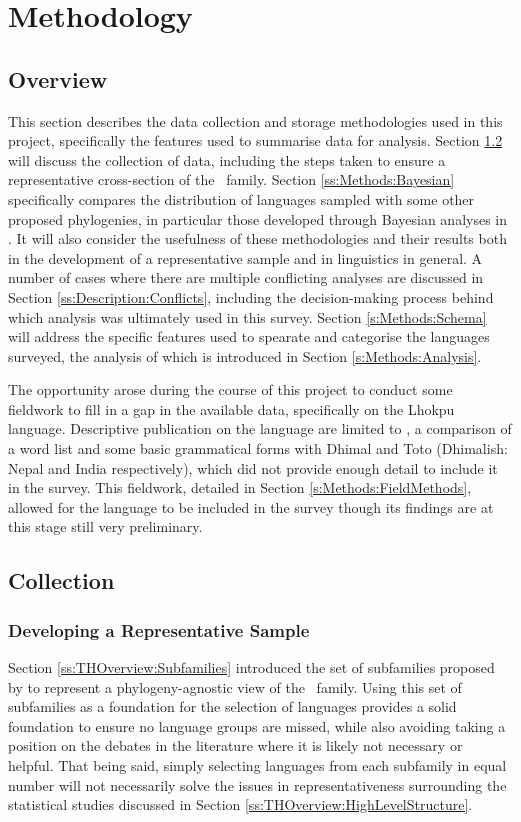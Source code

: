 \chapter{Methodology}\label{c:Methods}
\section{Overview}
This section describes the data collection and storage methodologies used in this project, specifically the features used to summarise data for analysis. Section \ref{s:Methods:Collection} will discuss the collection of data, including the steps taken to ensure a representative cross-section of the \lfam\ family. Section \ref{ss:Methods:Bayesian} specifically compares the distribution of languages sampled with some other proposed phylogenies, in particular those developed through Bayesian analyses in . It will also consider the usefulness of these methodologies and their results both in the development of a representative sample and in linguistics in general. A number of cases where there are multiple conflicting analyses are discussed in Section \ref{ss:Description:Conflicts}, including the decision-making process behind which analysis was ultimately used in this survey. Section \ref{s:Methods:Schema} will address the specific features used to spearate and categorise the languages surveyed, the analysis of which is introduced in Section \ref{s:Methods:Analysis}.

The opportunity arose during the course of this project to conduct some fieldwork to fill in a gap in the available data, specifically on the Lhokpu language. Descriptive publication on the language are limited to , a comparison of a word list and some basic grammatical forms with Dhimal and Toto (Dhimalish: Nepal and India respectively), which did not provide enough detail to include it in the survey. This fieldwork, detailed in Section \ref{s:Methods:FieldMethods}, allowed for the language to be included in the survey though its findings are at this stage still very preliminary.  

\section{Collection}\label{s:Methods:Collection}
\subsection{Developing a Representative Sample}\label{ss:Methods:RepSample}
Section \ref{ss:THOverview:Subfamilies} introduced the set of subfamilies proposed by  to represent a phylogeny-agnostic view of the \lfam\ family. Using this set of subfamilies as a foundation for the selection of languages provides a solid foundation to ensure no language groups are missed, while also avoiding taking a position on the debates in the literature where it is likely not necessary or helpful. That being said, simply selecting languages from each subfamily in equal number will not necessarily solve the issues in representativeness surrounding the statistical studies discussed in Section \ref{ss:THOverview:HighLevelStructure}.

